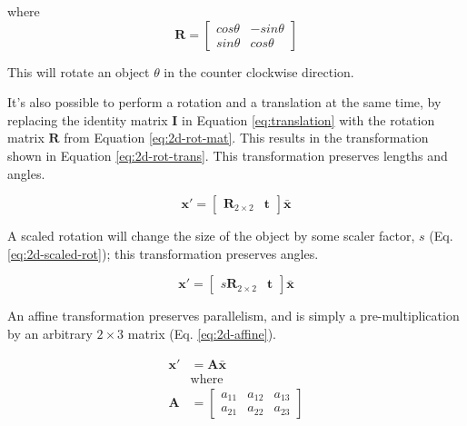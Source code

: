 where
\begin{equation}
    \mathbf{R} = \begin{bmatrix}
        cos\theta & -sin \theta \\ sin \theta & cos \theta 
    \end{bmatrix}
    \label{eq:2d-rot-mat}
\end{equation}

This will rotate an object $\theta$ in the counter clockwise direction. 

It's also possible to perform a rotation and a translation at the same time, by replacing the identity matrix $\mathbf{I}$ in Equation \ref{eq:translation} with the rotation matrix $\mathbf{R}$ from Equation \ref{eq:2d-rot-mat}. This results in the transformation shown in Equation \ref{eq:2d-rot-trans}. This transformation preserves lengths and angles.

\begin{equation}
    \mathbf{x}' = \begin{bmatrix}
        \mathbf{R}_{2 \times 2} & \mathbf{t}
    \end{bmatrix} \bar{\mathbf{x}}
    \label{eq:2d-rot-trans}
\end{equation}


A scaled rotation will change the size of the object by some scaler factor, $s$ (Eq. \ref{eq:2d-scaled-rot}); this transformation preserves angles.

\begin{equation}
    \mathbf{x}' = \begin{bmatrix}
        s\mathbf{R}_{2 \times 2} & \mathbf{t}
    \end{bmatrix}\bar{\mathbf{x}}
    \label{eq:2d-scaled-rot}
\end{equation}

An affine transformation preserves parallelism, and is simply a pre-multiplication by an arbitrary $2 \times 3$ matrix (Eq. \ref{eq:2d-affine}).

\begin{equation}
    \begin{aligned}
        \mathbf{x}' &= \mathbf{A\bar{x}}\\
        &\text{where}\\
        \mathbf{A} &= \begin{bmatrix}
            a_{11} & a_{12} & a_{13} \\ a_{21} & a_{22} & a_{23}
        \end{bmatrix}
    \end{aligned}
    \label{eq:2d-affine}
\end{equation}

